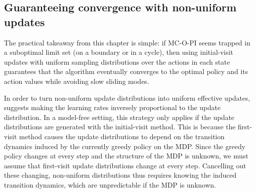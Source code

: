 

\subsection{Guaranteeing convergence with non-uniform updates}
\label{sec: normalisation trick}

The practical takeaway from this chapter is simple: if MC-O-PI seems trapped in a suboptimal limit set (on a boundary or in a cycle), 
then using initial-visit updates
with uniform sampling distributions over the actions in each state
guarantees that the algorithm eventually converges to the optimal policy and its action values
while avoiding slow sliding modes.




In order to turn non-uniform update distributions into uniform effective updates, \cite{Tsitsiklis2002OnIteration} suggests making the learning rates inversely proportional to the update distribution.
In a model-free setting, this strategy only applies if the update distributions are generated with the initial-visit method.
This is because the first-visit method causes the update distributions to depend on the transition dynamics induced by the currently greedy policy on the MDP.
Since the greedy policy changes at every step and the structure of the MDP is unknown,
we must assume that first-visit update distributions change at every step.
Cancelling out these changing, non-uniform distributions thus requires knowing the induced transition dynamics, which are unpredictable if the MDP is unknown.


